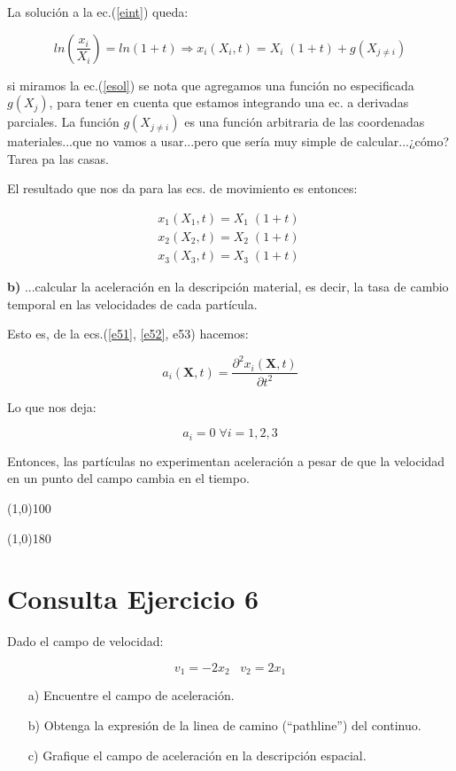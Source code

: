 \documentclass[10pt,a4paper]{article}
\theoremstyle{definition}
\begin{document}
La solución a la ec.(\ref{eint}) queda:

\begin{equation} \label{esol}
ln(\dfrac{x_i}{X_i}) = ln(1+t) \Rightarrow x_i(X_i, t)  = X_i \; (1+t) + g(X_{j \neq i})
\end{equation}

\noindent si miramos la ec.(\ref{esol}) se nota que agregamos una función no especificada $g(X_j)$, para tener en cuenta que estamos integrando una ec. a derivadas parciales. La función $g(X_{j\neq i})$ es una función arbitraria de las coordenadas materiales...que no vamos a usar...pero que sería muy simple de calcular...¿cómo? Tarea pa las casas.

El resultado que nos da para las ecs. de movimiento es entonces:

\begin{eqnarray}
\label{e51} x_1(X_1, t)  = X_1 \; (1+t) \\
\label{e52} x_2(X_2, t)  = X_2 \; (1+t) \\
\label{e53} x_3(X_3, t)  = X_3 \; (1+t) \
\end{eqnarray}


\textbf{b)} ...calcular la aceleración en la descripción material, es decir, la tasa de cambio temporal en las velocidades de cada partícula.

Esto es, de la ecs.(\ref{e51}, \ref{e52}, e53) hacemos:

\begin{equation} \label{eacel}
a_i(\mathbf{X}, t) = \dfrac{\partial^2 x_i(\mathbf{X}, t)}{\partial t^2}
\end{equation}

Lo que nos deja:

\begin{equation}
a_i = 0 \; \forall i= 1,2,3
\end{equation}


Entonces, las partículas no experimentan aceleración a pesar de que la velocidad en un punto del campo cambia en el tiempo.

\line(1,0){100}

\line(1,0){180}



\section*{Consulta Ejercicio 6}
Dado el campo de velocidad:

\begin{equation}\label{ee6}
 v_1=-2x_2 \; \; \; v_2=2x_1
\end{equation}
\begin{itemize}
\item[a)] Encuentre el campo de aceleraci\'on.
\item[b)] Obtenga la expresi\'on de la linea de camino (``pathline'') del continuo. 
\item[c)] Grafique el campo de aceleración en la descripción espacial.
\end{itemize}
\end{document}
